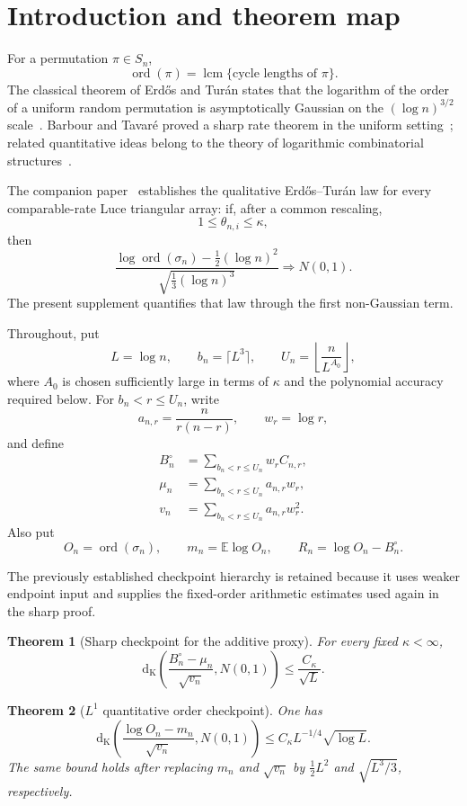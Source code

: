 \documentclass[11pt]{article}
\newtheorem{theorem}{Theorem}[section]
\theoremstyle{remark}
\newcommand{\Ee}{\mathbb E}
\newcommand{\ord}{\operatorname{ord}}
\newcommand{\lcm}{\operatorname{lcm}}
\newcommand{\Kol}{\mathrm d_{\mathrm K}}
\begin{document}
\section{Introduction and theorem map}

For a permutation $\pi\in S_n$,
\[
 \ord(\pi)=\lcm\{\text{cycle lengths of }\pi\}.
\]
The classical theorem of Erd\H{o}s and Tur\'an states that the logarithm of
the order of a uniform random permutation is asymptotically Gaussian on
the $(\log n)^{3/2}$ scale~\cite{ErdosTuran1967}.  Barbour and Tavar\'e
proved a sharp rate theorem in the uniform setting~\cite{BarbourTavare1994};
related quantitative ideas belong to the theory of logarithmic
combinatorial structures~\cite{ABT2003}.

The companion paper~\cite{LongOrder2026} establishes the qualitative
Erd\H{o}s--Tur\'an law for every comparable-rate Luce triangular array:
if, after a common rescaling,
\[
 1\le \theta_{n,i}\le\kappa,
\]
then
\[
 \frac{\log\ord(\sigma_n)-\frac12(\log n)^2}
 {\sqrt{\frac13(\log n)^3}}
 \Rightarrow N(0,1).
\]
The present supplement quantifies that law through the first non-Gaussian term.

Throughout, put
\[
 L=\log n,
 \qquad
 b_n=\lceil L^3\rceil,
 \qquad
 U_n=\left\lfloor\frac{n}{L^{A_0}}\right\rfloor,
\]
where $A_0$ is chosen sufficiently large in terms of $\kappa$ and the
polynomial accuracy required below.  For $b_n<r\le U_n$, write
\[
 a_{n,r}=\frac{n}{r(n-r)},
 \qquad
 w_r=\log r,
\]
and define
\begin{align*}
 B_n^\circ&=\sum_{b_n<r\le U_n}w_rC_{n,r},\\
 \mu_n&=\sum_{b_n<r\le U_n}a_{n,r}w_r,\\
 v_n&=\sum_{b_n<r\le U_n}a_{n,r}w_r^2.
\end{align*}
Also put
\[
 O_n=\ord(\sigma_n),
 \qquad
 m_n=\Ee\log O_n,
 \qquad
 R_n=\log O_n-B_n^\circ.
\]

The previously established checkpoint hierarchy is retained because it uses
weaker endpoint input and supplies the fixed-order arithmetic estimates used
again in the sharp proof.

\begin{theorem}[Sharp checkpoint for the additive proxy]
\label{thm:proxy}
For every fixed $\kappa<\infty$,
\[
 \Kol\!\left(
 \frac{B_n^\circ-\mu_n}{\sqrt{v_n}},N(0,1)\right)
 \le \frac{C_\kappa}{\sqrt L}.
\]
\end{theorem}

\begin{theorem}[$L^1$ quantitative order checkpoint]
\label{thm:order-checkpoint}
One has
\[
 \Kol\!\left(
 \frac{\log O_n-m_n}{\sqrt{v_n}},N(0,1)\right)
 \le C_\kappa L^{-1/4}\sqrt{\log L}.
\]
The same bound holds after replacing $m_n$ and $\sqrt{v_n}$ by
$\frac12L^2$ and $\sqrt{L^3/3}$, respectively.
\end{theorem}
\end{document}
